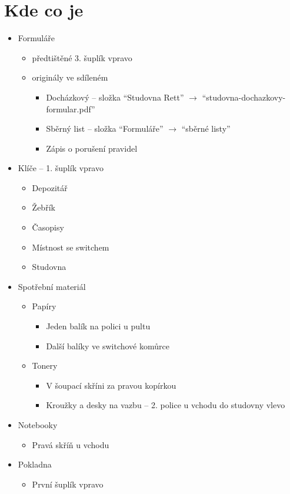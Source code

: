 \documentclass{article}
\begin{document}
\section{Kde co je}

\begin{itemize}
  \item Formuláře
    \begin{itemize}
      \item předtištěné 3. šuplík vpravo
      \item originály ve sdíleném
        \begin{itemize}
          \item Docházkový -- složka \enquote{Studovna Rett} $\rightarrow$ \enquote{studovna-dochazkovy-formular.pdf}
          \item Sběrný list -- složka \enquote{Formuláře} $\rightarrow$ \enquote{sběrné listy}
          \item Zápis o porušení pravidel
        \end{itemize}
    \end{itemize}
  \item Klíče -- 1. šuplík vpravo
    \begin{itemize}
      \item  Depozitář
      \item  Žebřík
      \item  Časopisy
      \item  Místnost se switchem
      \item  Studovna
    \end{itemize}
  \item Spotřební materiál
    \begin{itemize}
      \item Papíry
        \begin{itemize}
          \item  Jeden balík na polici u pultu
          \item  Další balíky ve switchové komůrce
        \end{itemize}
      \item  Tonery
        \begin{itemize}
          \item  V šoupací skříni za pravou kopírkou
          \item  Kroužky a desky na vazbu -- 2. police u vchodu do studovny vlevo
        \end{itemize}
    \end{itemize}
      \item Notebooky
        \begin{itemize}
      \item Pravá skříň u vchodu
    \end{itemize}
      \item Pokladna
        \begin{itemize}
          \item První šuplík vpravo
        \end{itemize}
    \end{itemize}
\end{document}
